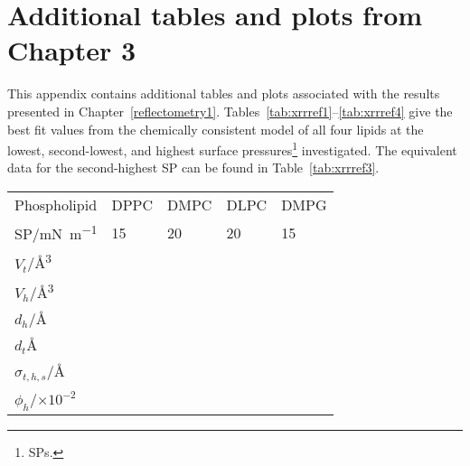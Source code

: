 \chapter{Additional tables and plots from Chapter 3}
\label{refl1}
This appendix contains additional tables and plots associated with the results presented in Chapter~\ref{reflectometry1}.
Tables~\ref{tab:xrrref1}--\ref{tab:xrrref4} give the best fit values from the chemically consistent model of all four lipids at the lowest, second-lowest, and highest surface pressures\footnote{SPs.} investigated.
The equivalent data for the second-highest SP can be found in Table~\ref{tab:xrrref3}.
%
\begin{sidewaystable}
    \centering
    \small
    \caption{The best-fit values, and associated \SI{95}{\percent} confidence intervals for each of the varying parameters for each phospholipid at the lowest SP measured from XRR. The values of $\phi_h$ were obtained from the appropriate use of Equation~\protect\ref{equ:phih}.}
    \label{tab:xrrref1}
    \begin{tabular}{l | l l l l}
        \toprule
        Phospholipid & DPPC & DMPC & DLPC & DMPG \\
        SP/\si{\milli\newton\per\meter} & 15 & 20 & 20 & 15 \\
        \midrule
        $V_t$/\si{\angstrom\cubed} &  &  &  &  \\
        $V_h$/\si{\angstrom\cubed} &  &  &  &  \\
        $d_h$/\si{\angstrom} &  &  &  &  \\
        \midrule
        $d_t$\si{\angstrom} &  &  &  &  \\
        $\sigma_{t,h,s}$/\si{\angstrom} &  &  &  &  \\
        \midrule
        $\phi_h$/$\times 10^{-2}$ &  &  &  &  \\
        \bottomrule
    \end{tabular}
\end{sidewaystable}
